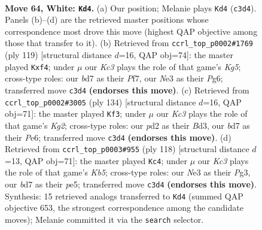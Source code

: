 \documentclass[11pt]{article}
\begin{document}
\clearpage

\begin{figure}[p]\centering
\begin{subfigure}{0.46\textwidth}\centering
\resizebox{\linewidth}{!}{%
\newchessgame
\chessboard[
  setfen={8/k2b4/8/P7/1P2n3/2K1N3/3p4/8 w - - 6 64},
  showmover=false,
  pgfstyle=straightmove, color=movearrow, markmove={c3-d4}
]}
\caption{}
\end{subfigure}\hfill
\begin{subfigure}{0.46\textwidth}\centering
\resizebox{\linewidth}{!}{%
\newchessgame
\chessboard[
  setfen={8/5p2/6p1/8/5Pk1/1p2N3/1P4K1/8 b - - 0 60},
  showmover=false,
  pgfstyle=straightmove, color=movearrow, markmove={g4-f4}
]}
\caption{}
\end{subfigure}
\\[4pt]
\begin{subfigure}{0.46\textwidth}\centering
\resizebox{\linewidth}{!}{%
\newchessgame
\chessboard[
  setfen={8/4p3/4P3/6kp/8/3Bn1P1/6K1/8 w - - 1 68},
  showmover=false,
  pgfstyle=straightmove, color=movearrow, markmove={g2-f3}
]}
\caption{}
\end{subfigure}\hfill
\begin{subfigure}{0.46\textwidth}\centering
\resizebox{\linewidth}{!}{%
\newchessgame
\chessboard[
  setfen={8/2k1N3/8/1KP1p2p/8/2n3P1/8/8 w - - 0 60},
  showmover=false,
  pgfstyle=straightmove, color=movearrow, markmove={b5-c4}
]}
\caption{}
\end{subfigure}
\caption{\textbf{Move 64, White: \texttt{Kd4}.} (a) Our position; Melanie plays \texttt{Kd4} (\texttt{c3d4}). Panels (b)--(d) are the retrieved master positions whose correspondence most drove this move (highest QAP objective among those that transfer to it). (b) Retrieved from \texttt{ccrl\_top\_p0002\#1769} (ply 119) [structural distance $d$=16, QAP obj=74]: the master played \texttt{Kxf4}; under $\mu$ our \emph{Kc3} plays the role of that game's \emph{Kg5}; cross-type roles: our \emph{b}d7 as their \emph{P}f7, our \emph{N}e3 as their \emph{P}g6; transferred move \texttt{c3d4} \textbf{(endorses this move)}. (c) Retrieved from \texttt{ccrl\_top\_p0002\#3005} (ply 134) [structural distance $d$=16, QAP obj=71]: the master played \texttt{Kf3}; under $\mu$ our \emph{Kc3} plays the role of that game's \emph{Kg2}; cross-type roles: our \emph{p}d2 as their \emph{B}d3, our \emph{b}d7 as their \emph{P}e6; transferred move \texttt{c3d4} \textbf{(endorses this move)}. (d) Retrieved from \texttt{ccrl\_top\_p0003\#955} (ply 118) [structural distance $d$=13, QAP obj=71]: the master played \texttt{Kc4}; under $\mu$ our \emph{Kc3} plays the role of that game's \emph{Kb5}; cross-type roles: our \emph{N}e3 as their \emph{P}g3, our \emph{b}d7 as their \emph{p}e5; transferred move \texttt{c3d4} \textbf{(endorses this move)}. Synthesis: 15 retrieved analogs transferred to \texttt{Kd4} (summed QAP objective 653, the strongest correspondence among the candidate moves); Melanie committed it via the \texttt{search} selector.}
\label{fig:thought-m126}
\end{figure}
\end{document}
